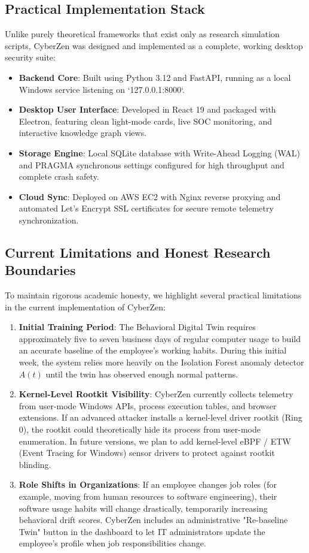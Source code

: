 \documentclass[conference]{IEEEtran}
\begin{document}
\subsection{Practical Implementation Stack}
Unlike purely theoretical frameworks that exist only as research simulation scripts, CyberZen was designed and implemented as a complete, working desktop security suite:
\begin{itemize}
    \item \textbf{Backend Core}: Built using Python 3.12 and FastAPI, running as a local Windows service listening on `127.0.0.1:8000`.
    \item \textbf{Desktop User Interface}: Developed in React 19 and packaged with Electron, featuring clean light-mode cards, live SOC monitoring, and interactive knowledge graph views.
    \item \textbf{Storage Engine}: Local SQLite database with Write-Ahead Logging (WAL) and PRAGMA synchronous settings configured for high throughput and complete crash safety.
    \item \textbf{Cloud Sync}: Deployed on AWS EC2 with Nginx reverse proxying and automated Let's Encrypt SSL certificates for secure remote telemetry synchronization.
\end{itemize}

\subsection{Current Limitations and Honest Research Boundaries}
To maintain rigorous academic honesty, we highlight several practical limitations in the current implementation of CyberZen:
\begin{enumerate}
    \item \textbf{Initial Training Period}: The Behavioral Digital Twin requires approximately five to seven business days of regular computer usage to build an accurate baseline of the employee's working habits. During this initial week, the system relies more heavily on the Isolation Forest anomaly detector $A(t)$ until the twin has observed enough normal patterns.
    \item \textbf{Kernel-Level Rootkit Visibility}: CyberZen currently collects telemetry from user-mode Windows APIs, process execution tables, and browser extensions. If an advanced attacker installs a kernel-level driver rootkit (Ring 0), the rootkit could theoretically hide its process from user-mode enumeration. In future versions, we plan to add kernel-level eBPF / ETW (Event Tracing for Windows) sensor drivers to protect against rootkit blinding.
    \item \textbf{Role Shifts in Organizations}: If an employee changes job roles (for example, moving from human resources to software engineering), their software usage habits will change drastically, temporarily increasing behavioral drift scores. CyberZen includes an administrative "Re-baseline Twin" button in the dashboard to let IT administrators update the employee's profile when job responsibilities change.
\end{enumerate}
\end{document}
